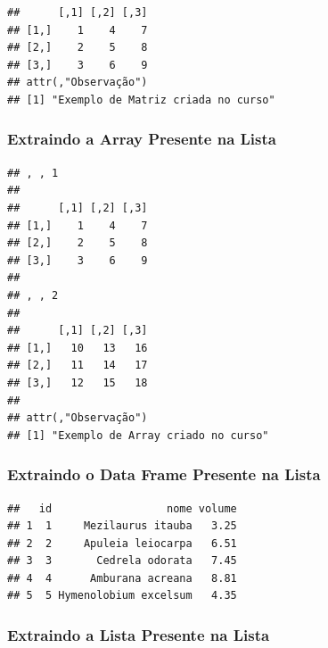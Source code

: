 \documentclass[
]{article}
\newenvironment{Shaded}{\begin{snugshade}}{\end{snugshade}}
\newcommand{\AttributeTok}[1]{\textcolor[rgb]{0.77,0.63,0.00}{#1}}
\newcommand{\NormalTok}[1]{#1}
\newcommand{\SpecialCharTok}[1]{\textcolor[rgb]{0.00,0.00,0.00}{#1}}
\newcommand{\StringTok}[1]{\textcolor[rgb]{0.31,0.60,0.02}{#1}}
\begin{document}
\begin{verbatim}
##      [,1] [,2] [,3]
## [1,]    1    4    7
## [2,]    2    5    8
## [3,]    3    6    9
## attr(,"Observação")
## [1] "Exemplo de Matriz criada no curso"
\end{verbatim}

\hypertarget{extraindo-a-array-presente-na-lista}{%
\subsubsection{Extraindo a Array Presente na
Lista}\label{extraindo-a-array-presente-na-lista}}

\begin{Shaded}
\end{Shaded}

\begin{verbatim}
## , , 1
## 
##      [,1] [,2] [,3]
## [1,]    1    4    7
## [2,]    2    5    8
## [3,]    3    6    9
## 
## , , 2
## 
##      [,1] [,2] [,3]
## [1,]   10   13   16
## [2,]   11   14   17
## [3,]   12   15   18
## 
## attr(,"Observação")
## [1] "Exemplo de Array criado no curso"
\end{verbatim}

\hypertarget{extraindo-o-data-frame-presente-na-lista}{%
\subsubsection{Extraindo o Data Frame Presente na
Lista}\label{extraindo-o-data-frame-presente-na-lista}}

\begin{Shaded}
\end{Shaded}

\begin{verbatim}
##   id                  nome volume
## 1  1     Mezilaurus itauba   3.25
## 2  2     Apuleia leiocarpa   6.51
## 3  3       Cedrela odorata   7.45
## 4  4      Amburana acreana   8.81
## 5  5 Hymenolobium excelsum   4.35
\end{verbatim}

\hypertarget{extraindo-a-lista-presente-na-lista}{%
\subsubsection{Extraindo a Lista Presente na
Lista}\label{extraindo-a-lista-presente-na-lista}}
\end{document}
